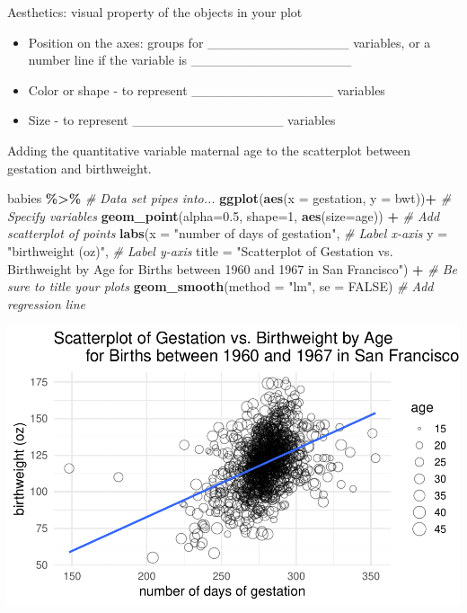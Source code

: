 \documentclass[
]{report}
\newenvironment{Shaded}{\begin{snugshade}}{\end{snugshade}}
\newcommand{\AttributeTok}[1]{\textcolor[rgb]{0.13,0.29,0.53}{#1}}
\newcommand{\CommentTok}[1]{\textcolor[rgb]{0.56,0.35,0.01}{\textit{#1}}}
\newcommand{\ConstantTok}[1]{\textcolor[rgb]{0.56,0.35,0.01}{#1}}
\newcommand{\DecValTok}[1]{\textcolor[rgb]{0.00,0.00,0.81}{#1}}
\newcommand{\FloatTok}[1]{\textcolor[rgb]{0.00,0.00,0.81}{#1}}
\newcommand{\FunctionTok}[1]{\textcolor[rgb]{0.13,0.29,0.53}{\textbf{#1}}}
\newcommand{\NormalTok}[1]{#1}
\newcommand{\SpecialCharTok}[1]{\textcolor[rgb]{0.81,0.36,0.00}{\textbf{#1}}}
\newcommand{\StringTok}[1]{\textcolor[rgb]{0.31,0.60,0.02}{#1}}
\begin{document}
Aesthetics: visual property of the objects in your plot


\begin{itemize}
\item
  Position on the axes: groups for \_\_\_\_\_\_\_\_\_\_\_\_\_\_\_ variables, or a number line if the variable is \_\_\_\_\_\_\_\_\_\_\_\_\_\_\_\_\_
\item
  Color or shape - to represent \_\_\_\_\_\_\_\_\_\_\_\_\_\_\_ variables
\item
  Size - to represent \_\_\_\_\_\_\_\_\_\_\_\_\_\_\_\_ variables
\end{itemize}


Adding the quantitative variable maternal age to the scatterplot between gestation and birthweight.

\begin{Shaded}
\begin{Highlighting}[]
\NormalTok{babies }\SpecialCharTok{\%\textgreater{}\%} \CommentTok{\# Data set pipes into...}
\FunctionTok{ggplot}\NormalTok{(}\FunctionTok{aes}\NormalTok{(}\AttributeTok{x =}\NormalTok{ gestation, }\AttributeTok{y =}\NormalTok{ bwt))}\SpecialCharTok{+}  \CommentTok{\# Specify variables}
  \FunctionTok{geom\_point}\NormalTok{(}\AttributeTok{alpha=}\FloatTok{0.5}\NormalTok{, }\AttributeTok{shape=}\DecValTok{1}\NormalTok{, }\FunctionTok{aes}\NormalTok{(}\AttributeTok{size=}\NormalTok{age)) }\SpecialCharTok{+}  \CommentTok{\# Add scatterplot of points}
  \FunctionTok{labs}\NormalTok{(}\AttributeTok{x =} \StringTok{"number of days of gestation"}\NormalTok{,  }\CommentTok{\# Label x{-}axis}
       \AttributeTok{y =} \StringTok{"birthweight (oz)"}\NormalTok{,  }\CommentTok{\# Label y{-}axis}
       \AttributeTok{title =} \StringTok{"Scatterplot of Gestation vs. Birthweight by Age }
\StringTok{       for Births between 1960 and 1967 in San Francisco"}\NormalTok{) }\SpecialCharTok{+} 
    \CommentTok{\# Be sure to title your plots}
  \FunctionTok{geom\_smooth}\NormalTok{(}\AttributeTok{method =} \StringTok{"lm"}\NormalTok{, }\AttributeTok{se =} \ConstantTok{FALSE}\NormalTok{)  }\CommentTok{\# Add regression line}
\end{Highlighting}
\end{Shaded}

\begin{center}\includegraphics[width=0.8\linewidth]{13-VN13-regression_files/figure-latex/unnamed-chunk-7-1} \end{center}
\end{document}

